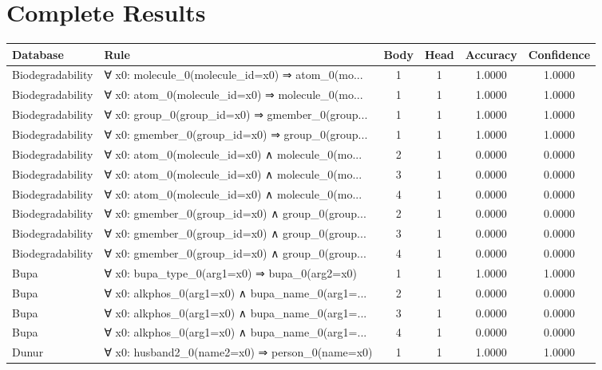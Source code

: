 \documentclass[11pt,a4paper]{article}
\begin{document}
\section{Complete Results}
\begin{table}[h!]
\centering
\tiny
\caption{All MAHILDA Rules - Complete Results}
\label{tab:all_rules}
\begin{longtable}{|l|p{6cm}|c|c|c|c|}
\hline
\textbf{Database} & \textbf{Rule} & \textbf{Body} & \textbf{Head} & \textbf{Accuracy} & \textbf{Confidence} \\
\hline
\endhead
Biodegradability & ∀ x0: molecule\_0(molecule\_id=x0) ⇒ atom\_0(mo... & 1 & 1 & 1.0000 & 1.0000 \\
Biodegradability & ∀ x0: atom\_0(molecule\_id=x0) ⇒ molecule\_0(mo... & 1 & 1 & 1.0000 & 1.0000 \\
Biodegradability & ∀ x0: group\_0(group\_id=x0) ⇒ gmember\_0(group... & 1 & 1 & 1.0000 & 1.0000 \\
Biodegradability & ∀ x0: gmember\_0(group\_id=x0) ⇒ group\_0(group... & 1 & 1 & 1.0000 & 1.0000 \\
Biodegradability & ∀ x0: atom\_0(molecule\_id=x0) ∧ molecule\_0(mo... & 2 & 1 & 0.0000 & 0.0000 \\
Biodegradability & ∀ x0: atom\_0(molecule\_id=x0) ∧ molecule\_0(mo... & 3 & 1 & 0.0000 & 0.0000 \\
Biodegradability & ∀ x0: atom\_0(molecule\_id=x0) ∧ molecule\_0(mo... & 4 & 1 & 0.0000 & 0.0000 \\
Biodegradability & ∀ x0: gmember\_0(group\_id=x0) ∧ group\_0(group... & 2 & 1 & 0.0000 & 0.0000 \\
Biodegradability & ∀ x0: gmember\_0(group\_id=x0) ∧ group\_0(group... & 3 & 1 & 0.0000 & 0.0000 \\
Biodegradability & ∀ x0: gmember\_0(group\_id=x0) ∧ group\_0(group... & 4 & 1 & 0.0000 & 0.0000 \\
Bupa & ∀ x0: bupa\_type\_0(arg1=x0) ⇒ bupa\_0(arg2=x0) & 1 & 1 & 1.0000 & 1.0000 \\
Bupa & ∀ x0: alkphos\_0(arg1=x0) ∧ bupa\_name\_0(arg1=... & 2 & 1 & 0.0000 & 0.0000 \\
Bupa & ∀ x0: alkphos\_0(arg1=x0) ∧ bupa\_name\_0(arg1=... & 3 & 1 & 0.0000 & 0.0000 \\
Bupa & ∀ x0: alkphos\_0(arg1=x0) ∧ bupa\_name\_0(arg1=... & 4 & 1 & 0.0000 & 0.0000 \\
Dunur & ∀ x0: husband2\_0(name2=x0) ⇒ person\_0(name=x0) & 1 & 1 & 1.0000 & 1.0000 \\

\end{longtable}
\end{table}
\end{document}
